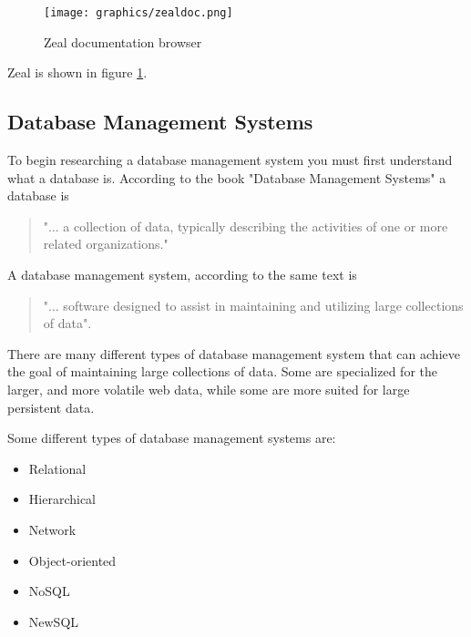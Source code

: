 \documentclass[letterpaper, 12pt]{article}
\begin{document}
\begin{figure}
    \centering
	\texttt{[image: graphics/zealdoc.png]}
    \caption{Zeal documentation browser} \label{zeal}
\end{figure}

Zeal is shown in figure \ref{zeal}.

\newpage


\subsection{Database Management Systems}
To begin researching a database management system you must first understand what a
database is. According to the book "Database Management Systems" a database is

\begin{quote}
"... a collection of data, typically describing the activities of one or more related
organizations."\cite{ramakrishnan2000database}
\end{quote}

A database management system, according to the same text is

\begin{quote}
"... software designed to assist in maintaining and utilizing large collections of data".
\cite{ramakrishnan2000database}
\end{quote}

There are many different types of database management system that can achieve the
goal of maintaining large collections of data. Some are specialized for the larger, and
more volatile web data, while some are more suited for large persistent data.
\par\vspace{\baselineskip}
Some different types of database management systems are:
\begin{itemize}
\item Relational
\item Hierarchical
\item Network
\item Object-oriented
\item NoSQL
\item NewSQL
\end{itemize}
\end{document}
